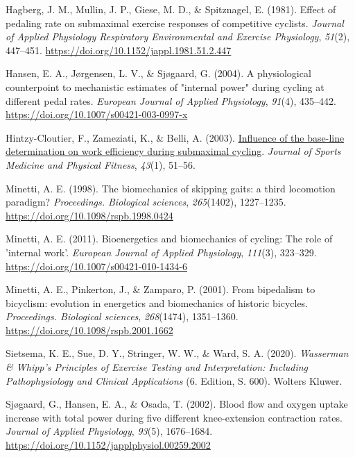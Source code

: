 \documentclass[
  letterpaper,
  DIV=11]{scrartcl}
\newlength{\cslhangindent}
\newenvironment{CSLReferences}[2] %
 {\begin{list}{}{%
  \setlength{\itemindent}{0pt}
  \setlength{\leftmargin}{0pt}
  \setlength{\parsep}{0pt}
  \ifodd #1
   \setlength{\leftmargin}{\cslhangindent}
   \setlength{\itemindent}{-1\cslhangindent}
  \fi
  \setlength{\itemsep}{#2\baselineskip}}}
 {\end{list}}
\begin{document}
\begin{CSLReferences}{1}{0}
Hagberg, J. M., Mullin, J. P., Giese, M. D., \& Spitznagel, E. (1981).
{Effect of pedaling rate on submaximal exercise responses of competitive
cyclists}. \emph{Journal of Applied Physiology Respiratory Environmental
and Exercise Physiology}, \emph{51}(2), 447--451.
\url{https://doi.org/10.1152/jappl.1981.51.2.447}

Hansen, E. A., Jørgensen, L. V., \& Sjøgaard, G. (2004). {A
physiological counterpoint to mechanistic estimates of "internal power"
during cycling at different pedal rates}. \emph{European Journal of
Applied Physiology}, \emph{91}(4), 435--442.
\url{https://doi.org/10.1007/s00421-003-0997-x}

Hintzy-Cloutier, F., Zameziati, K., \& Belli, A. (2003).
\href{https://www.ncbi.nlm.nih.gov/pubmed/12629462}{{Influence of the
base-line determination on work efficiency during submaximal cycling}}.
\emph{Journal of Sports Medicine and Physical Fitness}, \emph{43}(1),
51--56.

Minetti, A. E. (1998). {The biomechanics of skipping gaits: a third
locomotion paradigm?} \emph{Proceedings. Biological sciences},
\emph{265}(1402), 1227--1235.
\url{https://doi.org/10.1098/rspb.1998.0424}

Minetti, A. E. (2011). {Bioenergetics and biomechanics of cycling: The
role of 'internal work'}. \emph{European Journal of Applied Physiology},
\emph{111}(3), 323--329. \url{https://doi.org/10.1007/s00421-010-1434-6}

Minetti, A. E., Pinkerton, J., \& Zamparo, P. (2001). {From bipedalism
to bicyclism: evolution in energetics and biomechanics of historic
bicycles.} \emph{Proceedings. Biological sciences}, \emph{268}(1474),
1351--1360. \url{https://doi.org/10.1098/rspb.2001.1662}

Sietsema, K. E., Sue, D. Y., Stringer, W. W., \& Ward, S. A. (2020).
\emph{{Wasserman \& Whipp's Principles of Exercise Testing and
Interpretation: Including Pathophysiology and Clinical Applications}}
(6. Edition, S. 600). Wolters Kluwer.

Sjøgaard, G., Hansen, E. A., \& Osada, T. (2002). {Blood flow and oxygen
uptake increase with total power during five different knee-extension
contraction rates}. \emph{Journal of Applied Physiology}, \emph{93}(5),
1676--1684. \url{https://doi.org/10.1152/japplphysiol.00259.2002}


\end{CSLReferences}
\end{document}
